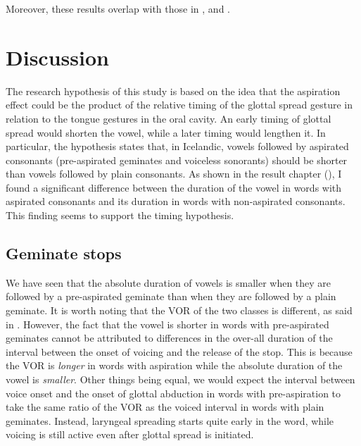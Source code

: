 \documentclass[11pt,a4paper,openany]{memoir}\usepackage[]{graphicx}\usepackage[]{color}
\begin{document}

Moreover, these results overlap with those in \citet{jessen1998}, \citet{bombien2006} and \citet{silverman2012}.







\chapter{Discussion}


The research hypothesis of this study is based on the idea that the aspiration effect could be the product of the relative timing of the glottal spread gesture in relation to the tongue gestures in the oral cavity.
An early timing of glottal spread would shorten the vowel, while a later timing would lengthen it.
In particular, the hypothesis states that, in Icelandic, vowels followed by aspirated consonants (pre-aspirated geminates and voiceless sonorants) should be shorter than vowels followed by plain consonants.
As shown in the result chapter (), I found a significant difference between the duration of the vowel in words with aspirated consonants and its duration in words with non-aspirated consonants.
This finding seems to support the timing hypothesis.

\section{Geminate stops}
We have seen that the absolute duration of vowels is smaller when they are followed by a pre-aspirated geminate than when they are followed by a plain geminate.
It is worth noting that the VOR of the two classes is different, as said in .
However, the fact that the vowel is shorter in words with pre-aspirated geminates cannot be attributed to differences in the over-all duration of the interval between the onset of voicing and the release of the stop.
This is because the VOR is \textit{longer} in words with aspiration while the absolute duration of the vowel is \textit{smaller}.
Other things being equal, we would expect the interval between voice onset and the onset of glottal abduction in words with pre-aspiration to take the same ratio of the VOR as the voiced interval in words with plain geminates.
Instead, laryngeal spreading starts quite early in the word, while voicing is still active even after glottal spread is initiated.
\end{document}
